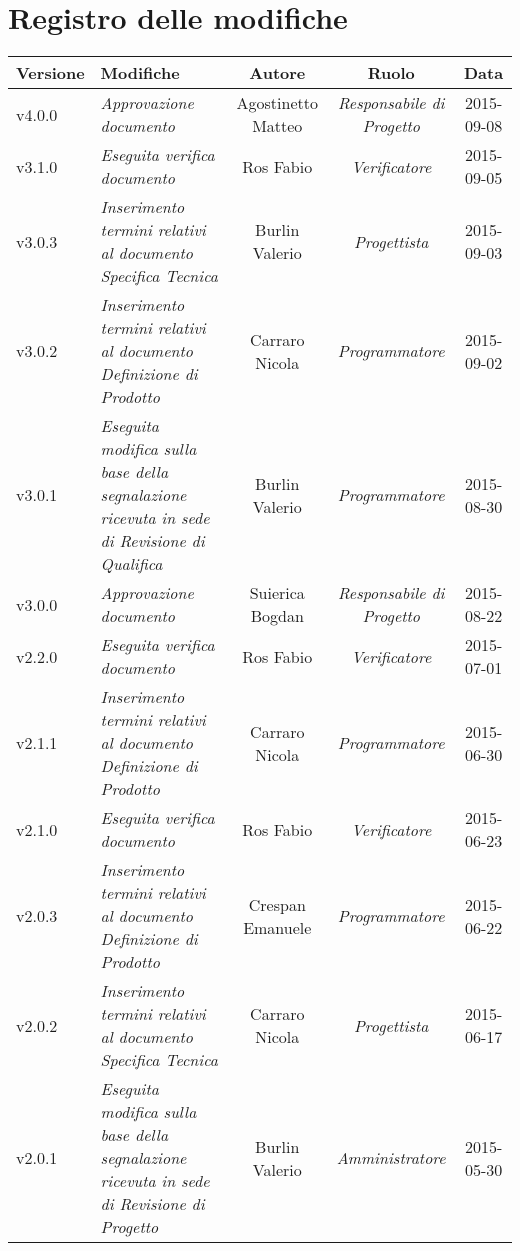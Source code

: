 \newpage
\section*{Registro delle modifiche}

\begin{table}[h]
\centering
\begin{tabular}{|p{}|p{}|c|c|c|}
	\toprule
		\textbf{Versione} & \textbf{Modifiche} & \textbf{Autore} & \textbf{Ruolo} & \textbf{Data} \\
	\midrule
	\midrule
		v4.0.0 & \textit{Approvazione documento} & Agostinetto Matteo & \textit{Responsabile di Progetto} & 2015-09-08\\
	\midrule
		v3.1.0 & \textit{Eseguita verifica documento} & Ros Fabio & \textit{Verificatore} & 2015-09-05\\
	\midrule
		v3.0.3 & \textit{Inserimento termini relativi al documento Specifica Tecnica} & Burlin Valerio & \textit{Progettista} & 2015-09-03\\
	\midrule
		v3.0.2 & \textit{Inserimento termini relativi al documento Definizione di Prodotto} & Carraro Nicola & \textit{Programmatore} & 2015-09-02\\
	\midrule
		v3.0.1 & \textit{Eseguita modifica sulla base della segnalazione ricevuta in sede di Revisione di Qualifica} & Burlin Valerio & \textit{Programmatore} & 2015-08-30\\
	\midrule
		v3.0.0 & \textit{Approvazione documento} & Suierica Bogdan & \textit{Responsabile di Progetto} & 2015-08-22\\
	\midrule
		v2.2.0 & \textit{Eseguita verifica documento} & Ros Fabio & \textit{Verificatore} & 2015-07-01\\
	\midrule
		v2.1.1 & \textit{Inserimento termini relativi al documento Definizione di Prodotto} & Carraro Nicola & \textit{Programmatore} & 2015-06-30\\
	\midrule
		v2.1.0 & \textit{Eseguita verifica documento} & Ros Fabio & \textit{Verificatore} & 2015-06-23\\
	\midrule
		v2.0.3 & \textit{Inserimento termini relativi al documento Definizione di Prodotto} & Crespan Emanuele & \textit{Programmatore} & 2015-06-22\\
	\midrule
		v2.0.2 & \textit{Inserimento termini relativi al documento Specifica Tecnica} & Carraro Nicola & \textit{Progettista} & 2015-06-17\\
	\midrule
		v2.0.1 & \textit{Eseguita modifica sulla base della segnalazione ricevuta in sede di Revisione di Progetto} & Burlin Valerio & \textit{Amministratore} & 2015-05-30\\

\end{tabular}
\end{table}
